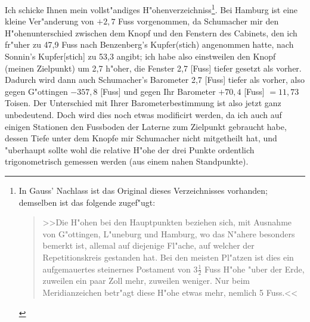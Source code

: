 \documentclass[12pt,a4paper]{article}
\theoremstyle{plain}
\theoremstyle{definition}
\theoremstyle{remark}
\begin{document}
\medskip
\noindent Ich schicke Ihnen mein vollst"andiges H"ohenverzeichniss\footnote{In Gauss' Nachlass ist das Original dieses Verzeichnisses vorhanden; demselben ist das folgende zugef"ugt:
\begin{quote}
>>Die H"ohen bei den Hauptpunkten beziehen sich, mit Ausnahme von G"ottingen, L"uneburg und Hamburg, wo das N"ahere besonders bemerkt ist, allemal auf diejenige Fl"ache, auf welcher der Repetitionskreis gestanden hat. Bei den meisten Pl"atzen ist dies ein aufgemauertes steinernes Postament von $3\frac{1}{2}$ Fuss H"ohe "uber der Erde, zuweilen ein paar Zoll mehr, zuweilen weniger. Nur beim Meridianzeichen betr"agt diese H"ohe etwas mehr, nemlich 5 Fuss.<<
\end{quote}}. Bei Hamburg ist eine kleine Ver"anderung von $+2,7$ Fuss vorgenommen, da Schumacher mir den H"ohenunterschied zwischen dem Knopf und den Fenstern des Cabinets, den ich fr"uher zu 47,9 Fuss nach Benzenberg's Kupfer(stich) angenommen hatte, nach Sonnin's Kupfer[stich] zu 53,3 angibt; ich habe also einstweilen den Knopf (meinen Zielpunkt) um 2,7 h"oher, die Fenster 2,7 [Fuss] tiefer gesetzt als vorher. Dadurch wird dann auch Schumacher's Barometer 2,7 [Fuss] tiefer als vorher, also gegen G"ottingen $-357,8$ [Fuss] und gegen Ihr Barometer $+70,4$ [Fuss] $= 11,73$ Toisen. Der Unterschied mit Ihrer Barometerbestimmung ist also jetzt ganz unbedeutend. Doch wird dies noch etwas modificirt werden, da ich auch auf einigen Stationen den Fussboden der Laterne zum Zielpunkt gebraucht habe, dessen Tiefe unter dem Knopfe mir Schumacher nicht mitgetheilt hat, und "uberhaupt sollte wohl die relative H"ohe der drei Punkte ordentlich trigonometrisch gemessen werden (aus einem nahen Standpunkte).
\end{document}

